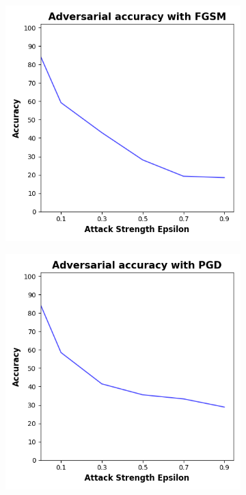 \begin{figure}[!h]
  \centering

  \begin{subfigure}{0.45\textwidth}
      \includegraphics[width=\linewidth]{figures/evaluation_results/breast-cancer/pqc/figures/none-fgsm.png}
      \label{fig:bc3}
  \end{subfigure} \qquad
  \begin{subfigure}{0.45\textwidth}
      \includegraphics[width=\linewidth]{figures/evaluation_results/breast-cancer/pqc/figures/none-pgd.png}
      \label{fig:bc4}
  \end{subfigure}


\end{figure}
